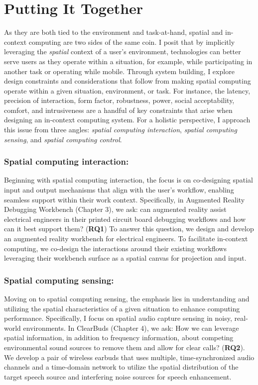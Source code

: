 \documentclass [11pt, proquest] {uwthesis}[2020/02/24]
\begin{document}
 
\section{Putting It Together}
 
As they are both tied to the environment and task-at-hand, spatial and in-context computing are two sides of the same coin. I posit that by implicitly leveraging the \textit{spatial} context of a user’s environment, technologies can better serve users as they operate within a situation, for example, while participating in another task or operating while mobile. Through system building, I explore design constraints and considerations that follow from making spatial computing operate within a given situation, environment, or task. For instance, the latency, precision of interaction, form factor, robustness, power, social acceptability, comfort, and intrusiveness are a handful of key constraints that arise when designing an in-context computing system. For a holistic perspective, I approach this issue from three angles: \textit{spatial computing interaction}, \textit{spatial computing sensing}, and \textit{spatial computing control}.

\subsubsection{Spatial computing interaction:} Beginning with spatial computing interaction, the focus is on co-designing spatial input and output mechanisms that align with the user's workflow, enabling seamless support within their work context. Specifically, in Augmented Reality Debugging Workbench (Chapter 3), we ask: can augmented reality assist electrical engineers in their printed circuit board debugging workflows and how can it best support them? (\textbf{RQ1}) To answer this question, we design and develop an augmented reality workbench for electrical engineers. To facilitate in-context computing, we co-design the interactions around their existing workflows leveraging their workbench surface as a spatial canvas for projection and input.

\subsubsection{Spatial computing sensing:} Moving on to spatial computing sensing, the emphasis lies in understanding and utilizing the spatial characteristics of a given situation to enhance computing performance. Specifically, I focus on spatial audio capture sensing in noisy, real-world environments. In ClearBuds (Chapter 4), we ask: How we can leverage spatial information, in addition to frequency information, about competing environmental sound sources to remove them and allow for clear calls? (\textbf{RQ2}). We develop a pair of wireless earbuds that uses multiple, time-synchronized audio channels and a time-domain network to utilize the spatial distribution of the target speech source and interfering noise sources for speech enhancement.
\end{document}

